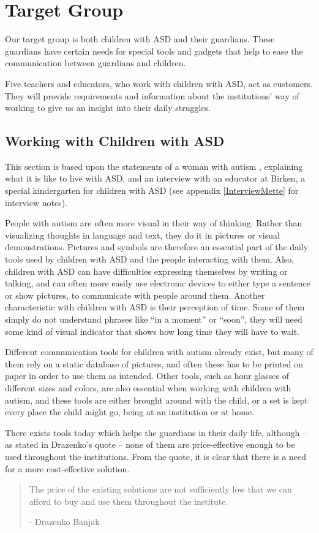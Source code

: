\section{Target Group}
Our target group is both children with ASD and their guardians. These guardians have certain needs for special tools and gadgets that help to ease the communication between guardians and children.

Five teachers and educators, who work with children with ASD, act as customers. They will provide requirements and information about the institutions' way of working to give us an insight into their daily struggles.

\subsection{Working with Children with ASD}
This section is based upon the statements of a woman with autism \cite{autism.com}, explaining what it is like to live with ASD, and an interview with an educator at Birken, a special kindergarten for children with ASD (see appendix \ref{InterviewMette} for interview notes).

	People with autism are often more visual in their way of thinking. Rather than visualizing thoughts in language and text, they do it in pictures or visual demonstrations. Pictures and symbols are therefore an essential part of the daily tools used by children with ASD and the people interacting with them. Also, children with ASD can have difficulties expressing themselves by writing or talking, and can often more easily use electronic devices to either type a sentence or show pictures, to communicate with people around them.
	Another characteristic with children with ASD is their perception of time. Some of them simply do not understand phrases like "`in a moment"' or "`soon"', they will need some kind of visual indicator that shows how long time they will have to wait.

Different communication tools for children with autism already exist, but many of them rely on a static database of pictures, and often these has to be printed on paper in order to use them as intended. Other tools, such as hour glasses of different sizes and colors, are also essential when working with children with autism, and these tools are either brought around with the child, or a set is kept every place the child might go, being at an institution or at home.

There exists tools today which helps the guardians in their daily life, although -- as stated in Drazenko's quote -- none of them are price-effective enough to be used throughout the institutions. From the quote, it is clear that there is a need for a more cost-effective solution.

\begin{quotation}
The price of the existing solutions are not sufficiently low that we can afford to buy and use them throughout the institute.\\ 
	\begin{flushright}
		- Drazenko Banjak
	\end{flushright}
\end{quotation}